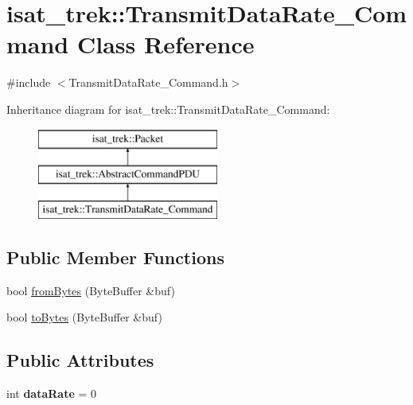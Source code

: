 \hypertarget{classisat__trek_1_1_transmit_data_rate___command}{}\section{isat\+\_\+trek\+:\+:Transmit\+Data\+Rate\+\_\+\+Command Class Reference}
\label{classisat__trek_1_1_transmit_data_rate___command}


{\ttfamily \#include $<$Transmit\+Data\+Rate\+\_\+\+Command.\+h$>$}

Inheritance diagram for isat\+\_\+trek\+:\+:Transmit\+Data\+Rate\+\_\+\+Command\+:\begin{figure}[H]
\begin{center}
\leavevmode
\includegraphics[height=3.000000cm]{classisat__trek_1_1_transmit_data_rate___command}
\end{center}
\end{figure}
\subsection*{Public Member Functions}
\begin{DoxyCompactItemize}
\item 
bool \hyperlink{classisat__trek_1_1_transmit_data_rate___command_a742b7a00d0004729d996c9686c33d713}{from\+Bytes} (Byte\+Buffer \&buf)
\item 
bool \hyperlink{classisat__trek_1_1_transmit_data_rate___command_a0bed03466ba6c0418ed8c1145a9749e7}{to\+Bytes} (Byte\+Buffer \&buf)
\end{DoxyCompactItemize}
\subsection*{Public Attributes}
\begin{DoxyCompactItemize}
\item 
int {\bfseries data\+Rate} = 0\hypertarget{classisat__trek_1_1_transmit_data_rate___command_a0e6d265ef39bffcaa7fc1b40bad6fa08}{}\label{classisat__trek_1_1_transmit_data_rate___command_a0e6d265ef39bffcaa7fc1b40bad6fa08}

\end{DoxyCompactItemize}


